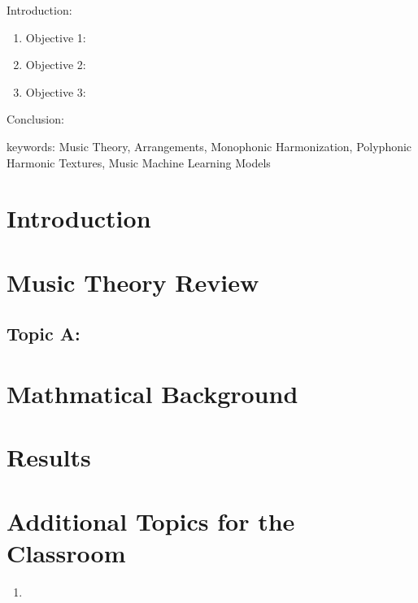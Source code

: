 


\twocolumn
\scriptsize
\begin{frontmatter}
		\title{}
		\author{}
		\address{The Mathematical Learning Space}
\end{frontmatter}	

Introduction:
\begin{enumerate}
\item Objective 1:
\item Objective 2:
\item Objective 3:
\end{enumerate}
Conclusion:

keywords: Music Theory, Arrangements, Monophonic Harmonization, Polyphonic Harmonic Textures, Music Machine Learning Models


\section{Introduction}


\section{Music Theory Review}

\subsection{Topic A:}

\section{Mathmatical Background}

\section{Results}


\section{Additional Topics for the Classroom}

\begin{enumerate}
\item 
\end{enumerate}




\begin{thebibliography}{00}

\end{thebibliography}



